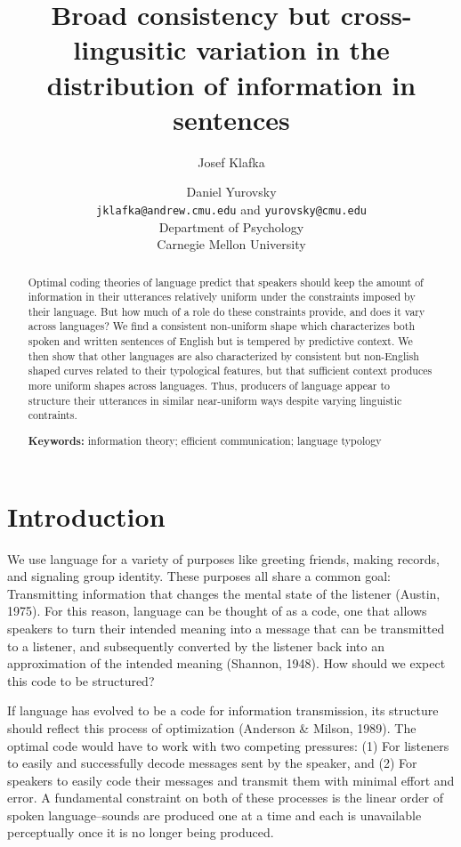 \documentclass[10pt, letterpaper]{article}
\title{Broad consistency but cross-lingusitic variation in the distribution of
information in sentences}
\author{Josef Klafka \and Daniel Yurovsky \\
        \texttt{jklafka@andrew.cmu.edu} and \texttt{yurovsky@cmu.edu} \\
       Department of Psychology \\ Carnegie Mellon University}
\begin{document}
\maketitle

\begin{abstract}
Optimal coding theories of language predict that speakers should keep
the amount of information in their utterances relatively uniform under
the constraints imposed by their language. But how much of a role do
these constraints provide, and does it vary across languages? We find a
consistent non-uniform shape which characterizes both spoken and written
sentences of English but is tempered by predictive context. We then show
that other languages are also characterized by consistent but
non-English shaped curves related to their typological features, but
that sufficient context produces more uniform shapes across languages.
Thus, producers of language appear to structure their utterances in
similar near-uniform ways despite varying linguistic contraints.

\textbf{Keywords:}
information theory; efficient communication; language typology
\end{abstract}

\hypertarget{introduction}{%
\section{Introduction}\label{introduction}}

We use language for a variety of purposes like greeting friends, making
records, and signaling group identity. These purposes all share a common
goal: Transmitting information that changes the mental state of the
listener (Austin, 1975). For this reason, language can be thought of as
a code, one that allows speakers to turn their intended meaning into a
message that can be transmitted to a listener, and subsequently
converted by the listener back into an approximation of the intended
meaning (Shannon, 1948). How should we expect this code to be
structured?

If language has evolved to be a code for information transmission, its
structure should reflect this process of optimization (Anderson \&
Milson, 1989). The optimal code would have to work with two competing
pressures: (1) For listeners to easily and successfully decode messages
sent by the speaker, and (2) For speakers to easily code their messages
and transmit them with minimal effort and error. A fundamental
constraint on both of these processes is the linear order of spoken
language--sounds are produced one at a time and each is unavailable
perceptually once it is no longer being produced.
\end{document}
